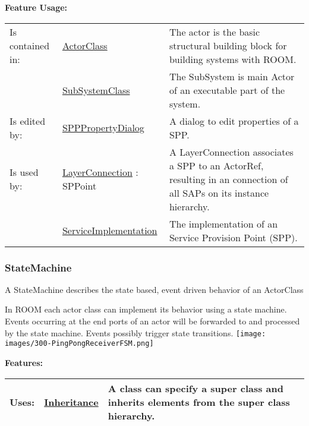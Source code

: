 	\begingroup
	\textbf{Feature Usage:}
	\renewcommand{\arraystretch}{1.8} %
	\begin{longtable}{l|l p{}}
		\hline
	Is contained in: & \tabitem \hyperlink{ref:ActorClass}{ActorClass}  & The actor is the basic structural building block for building systems with ROOM.\\
	& \tabitem \hyperlink{ref:SubSystemClass}{SubSystemClass}  & The SubSystem is main Actor of an executable part of the system.  \\
	\hline
	Is edited by: & \tabitem \hyperlink{ref:SPPPropertyDialog}{SPPPropertyDialog}  & A dialog to edit properties of a SPP.\\
	\hline
	Is used by: & \tabitem \hyperlink{ref:LayerConnection}{LayerConnection} : SPPoint & A LayerConnection associates a SPP to an ActorRef, resulting in an connection of all SAPs on its instance hierarchy.\\
	& \tabitem \hyperlink{ref:ServiceImplementation}{ServiceImplementation}  & The implementation of an Service Provision Point (SPP). \\
	\hline
	\end{longtable}
	\endgroup
		
	
	\vspace{\baselineskip}
	\vspace{\baselineskip}
	\vspace{\baselineskip}
	
\subsubsection{StateMachine}
	\hypertarget{ref:StateMachine}{}
	A StateMachine describes the state based, event driven behavior of an ActorClass
		
	In ROOM each actor class can implement its behavior using a state machine. Events occurring at the end ports of an actor will be forwarded to and processed by the state machine. Events possibly trigger state transitions.
	\texttt{[image: images/300-PingPongReceiverFSM.png]}
		
		
	\begingroup
	\textbf{Features:}
	\renewcommand{\arraystretch}{1.8} %
	\begin{longtable}{l|l p{}}
		\hline
	Uses: & \tabitem \hyperlink{ref:Inheritance}{Inheritance}  & A class can specify a super class and inherits elements from the super class hierarchy.\\
	\hline
	\end{longtable}
	\endgroup
		
